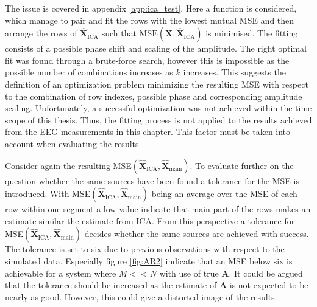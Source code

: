The issue is covered in appendix \ref{app:ica_test}. 
Here a function is considered, which manage to pair and fit the rows with the lowest mutual MSE and then arrange the rows of $\hat{\mathbf{X}}_{\text{ICA}}$ such that $\text{MSE}(\mathbf{X}, \hat{\textbf{X}}_{\text{ICA}})$ is minimised. 
The fitting consists of a possible phase shift and scaling of the amplitude. 
The right optimal fit was found through a brute-force search, however this is impossible as the possible number of combinations increases as $k$ increases. 
This suggests the definition of an optimization problem minimizing the resulting MSE with respect to the combination of row indexes, possible phase and corresponding amplitude scaling. 
Unfortunately, a successful optimization was not achieved within the time scope of this thesis.
Thus, the fitting process is not applied to the results achieved from the EEG measurements in this chapter. 
This factor must be taken into account when evaluating the results.

Consider again the resulting MSE$(\hat{\mathbf{X}}_{\text{ICA}}, \hat{\mathbf{X}}_{\text{main}})$. 
To evaluate further on the question whether the same sources have been found a tolerance for the MSE is introduced. 
With MSE$(\hat{\mathbf{X}}_{\text{ICA}}, \hat{\mathbf{X}}_{\text{main}})$ being an average over the MSE of each row within one segment a low value indicate that main part of the rows makes an estimate similar the estimate from ICA. 
From this perspective a tolerance for MSE$(\hat{\mathbf{X}}_{\text{ICA}}, \hat{\mathbf{X}}_{\text{main}})$ decides whether the same sources are achieved with success. 
The tolerance is set to six due to previous observations with respect to the simulated data. Especially figure \ref{fig:AR2} indicate that an MSE below six is achievable for a system where $M << N$ with use of true $\mathbf{A}$. 
It could be argued that the tolerance should be increased as the estimate of $\mathbf{A}$ is not expected to be nearly as good. 
However, this could give a distorted image of the results.    

